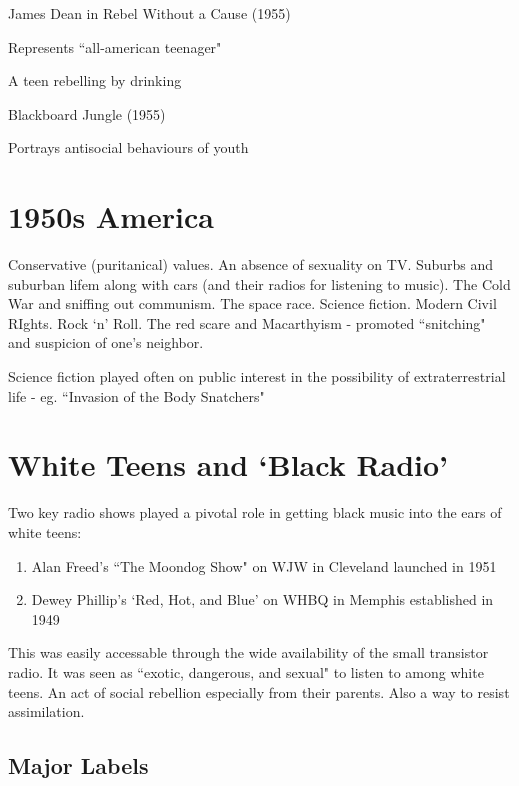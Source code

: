 \documentclass[12pt, a4paper, twoside, openright, titlepage]{book}
\begin{document}
\begin{eg}{}{}
    James Dean in Rebel Without a Cause (1955)

    Represents ``all-american teenager"

    A teen rebelling by drinking
\end{eg}

\begin{eg}{}{}
    Blackboard Jungle (1955)

    Portrays antisocial behaviours of youth
\end{eg}


\section{1950s America}

Conservative (puritanical) values. An absence of sexuality on TV. Suburbs and suburban lifem along with cars (and their radios for listening to music). The Cold War and sniffing out communism. The space race. Science fiction. Modern Civil RIghts. Rock `n' Roll. The red scare and Macarthyism - promoted ``snitching" and suspicion of one's neighbor.

Science fiction played often on public interest in the possibility of extraterrestrial life - eg. ``Invasion of the Body Snatchers"

\section{White Teens and `Black Radio'}

Two key radio shows played a pivotal role in getting black music into the ears of white teens: \begin{enumerate}
    \item Alan Freed's ``The Moondog Show" on WJW in Cleveland launched in 1951
    \item Dewey Phillip's `Red, Hot, and Blue' on WHBQ in Memphis established in 1949
\end{enumerate}

This was easily accessable through the wide availability of the small transistor radio. It was seen as ``exotic, dangerous, and sexual" to listen to among white teens. An act of social rebellion especially from their parents. Also a way to resist assimilation.

\subsection{Major Labels}
\end{document}
